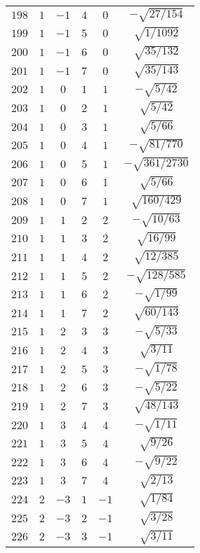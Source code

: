 \begin{table}
\begin{center}
\begin{tabular}{|c|c|c|c|c|c|}
$198$ & $1$ & $-1$ & $4$ & $0$ & $-\sqrt{27/154}$ \\ 
$199$ & $1$ & $-1$ & $5$ & $0$ & $\sqrt{1/1092}$ \\ 
$200$ & $1$ & $-1$ & $6$ & $0$ & $\sqrt{35/132}$ \\ 
$201$ & $1$ & $-1$ & $7$ & $0$ & $\sqrt{35/143}$ \\ 
$202$ & $1$ & $0$ & $1$ & $1$ & $-\sqrt{5/42}$ \\ 
$203$ & $1$ & $0$ & $2$ & $1$ & $\sqrt{5/42}$ \\ 
$204$ & $1$ & $0$ & $3$ & $1$ & $\sqrt{5/66}$ \\ 
$205$ & $1$ & $0$ & $4$ & $1$ & $-\sqrt{81/770}$ \\ 
$206$ & $1$ & $0$ & $5$ & $1$ & $-\sqrt{361/2730}$ \\ 
$207$ & $1$ & $0$ & $6$ & $1$ & $\sqrt{5/66}$ \\ 
$208$ & $1$ & $0$ & $7$ & $1$ & $\sqrt{160/429}$ \\ 
$209$ & $1$ & $1$ & $2$ & $2$ & $-\sqrt{10/63}$ \\ 
$210$ & $1$ & $1$ & $3$ & $2$ & $\sqrt{16/99}$ \\ 
$211$ & $1$ & $1$ & $4$ & $2$ & $\sqrt{12/385}$ \\ 
$212$ & $1$ & $1$ & $5$ & $2$ & $-\sqrt{128/585}$ \\ 
$213$ & $1$ & $1$ & $6$ & $2$ & $-\sqrt{1/99}$ \\ 
$214$ & $1$ & $1$ & $7$ & $2$ & $\sqrt{60/143}$ \\ 
$215$ & $1$ & $2$ & $3$ & $3$ & $-\sqrt{5/33}$ \\ 
$216$ & $1$ & $2$ & $4$ & $3$ & $\sqrt{3/11}$ \\ 
$217$ & $1$ & $2$ & $5$ & $3$ & $-\sqrt{1/78}$ \\ 
$218$ & $1$ & $2$ & $6$ & $3$ & $-\sqrt{5/22}$ \\ 
$219$ & $1$ & $2$ & $7$ & $3$ & $\sqrt{48/143}$ \\ 
$220$ & $1$ & $3$ & $4$ & $4$ & $-\sqrt{1/11}$ \\ 
$221$ & $1$ & $3$ & $5$ & $4$ & $\sqrt{9/26}$ \\ 
$222$ & $1$ & $3$ & $6$ & $4$ & $-\sqrt{9/22}$ \\ 
$223$ & $1$ & $3$ & $7$ & $4$ & $\sqrt{2/13}$ \\ 
$224$ & $2$ & $-3$ & $1$ & $-1$ & $\sqrt{1/84}$ \\ 
$225$ & $2$ & $-3$ & $2$ & $-1$ & $\sqrt{3/28}$ \\ 
$226$ & $2$ & $-3$ & $3$ & $-1$ & $\sqrt{3/11}$ \\ 

\end{tabular}
\end{center}
\end{table}
